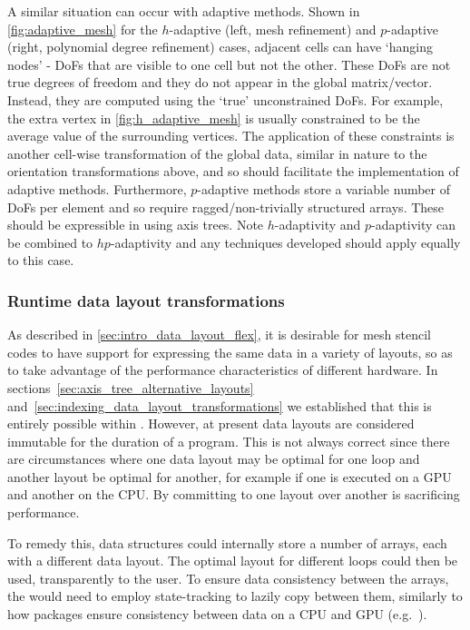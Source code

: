 \documentclass[thesis]{subfiles}
\begin{document}
A similar situation can occur with adaptive methods.
Shown in \cref{fig:adaptive_mesh} for the $h$-adaptive (left, mesh refinement) and $p$-adaptive (right, polynomial degree refinement) cases, adjacent cells can have `hanging nodes' - DoFs that are visible to one cell but not the other.
These DoFs are not true degrees of freedom and they do not appear in the global matrix/vector.
Instead, they are computed using the `true' unconstrained DoFs.
For example, the extra vertex in \cref{fig:h_adaptive_mesh} is usually constrained to be the average value of the surrounding vertices.
The application of these constraints is another cell-wise transformation of the global data, similar in nature to the orientation transformations above, and so  should facilitate the implementation of adaptive methods.
Furthermore, $p$-adaptive methods store a variable number of DoFs per element and so require ragged/non-trivially structured arrays.
These should be expressible in  using axis trees.
Note $h$-adaptivity and $p$-adaptivity can be combined to $hp$-adaptivity and any techniques developed should apply equally to this case.

\subsubsection{Runtime data layout transformations}

As described in \cref{sec:intro_data_layout_flex}, it is desirable for mesh stencil codes to have support for expressing the same data in a variety of layouts, so as to take advantage of the performance characteristics of different hardware.
In sections~\ref{sec:axis_tree_alternative_layouts} and~\ref{sec:indexing_data_layout_transformations} we established that this is entirely possible within .
However, at present data layouts are considered immutable for the duration of a program.
This is not always correct since there are circumstances where one data layout may be optimal for one loop and another layout be optimal for another, for example if one is executed on a GPU and another on the CPU.
By committing to one layout over another  is sacrificing performance.

To remedy this,  data structures could internally store a number of arrays, each with a different data layout.
The optimal layout for different loops could then be used, transparently to the user.
To ensure data consistency between the arrays, the  would need to employ state-tracking to lazily copy between them, similarly to how packages ensure consistency between data on a CPU and GPU (e.g.~\cite{millsPerformancePortablePETScGPUbased2020}).
\end{document}
